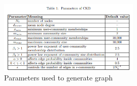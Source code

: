 \documentclass[a4paper]{article}
\begin{document}
\begin{enumerate}
\begin{enumerate}
\end{enumerate}
 
\end{enumerate}

\begin{figure}[h!] 
\centering
\includegraphics[width=0.6\textwidth]{ckb.PNG}
\caption{\label{fig:Parameters}Parameters used to generate graph}
\end{figure}
\end{document}
